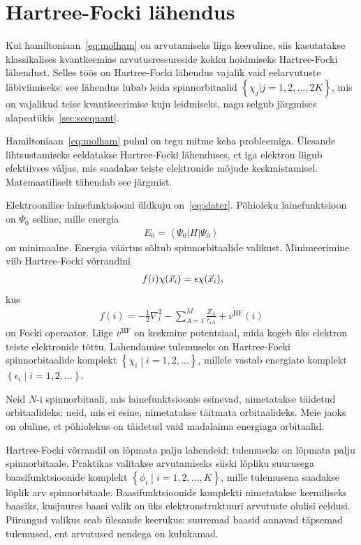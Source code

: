 \documentclass[12pt]{report}
\def\cparen#1{\left\{#1\right\}}
\def\bra#1{\left<#1\right|}
\def\ket#1{\left|#1\right>}
\begin{document}
\section{Hartree-Focki lähendus}\label{sec:hartfock}

Kui hamiltoniaan~\eqref{eq:molham} on arvutamiseks liiga keeruline, siis kasutatakse klassikalises kvantkeemias arvutusressursside kokku hoidmiseks Hartree-Focki lähendust.
Selles töös on Hartree-Focki lähendus vajalik vaid eelarvutuste läbiviimiseks: see lähendus lubab leida spinnorbitaalid \(\cparen{\chi_j | j=1, 2, \ldots, 2K}\), mis on vajalikud teise kvantiseerimise kuju leidmiseks, nagu selgub järgmises alapeatükis~\ref{sec:secquant}.

Hamiltoniaan~\ref{eq:molham} puhul on tegu mitme keha probleemiga.
Ülesande lihtsustamiseks eeldatakse Hartree-Focki lähenduses, et iga elektron liigub efektiivses väljas, mis saadakse teiste elektronide mõjude keskmistamisel.
Matemaatiliselt tähendab see järgmist.

Elektroonilise lainefunktsiooni üldkuju on~\eqref{eq:slater}.
Põhioleku lainefunktsioon on \(\Psi_0\) selline, mille energia
\begin{align}
    E_0 = \bra{\Psi_0} H \ket{\Psi_0}
\end{align}
on minimaalne.
Energia väärtus sõltub spinnorbitaalide valikust.
Minimeerimine viib Hartree-Focki võrrandini
\begin{align}
    f(i) \chi(\vec{x}_i) = \epsilon \chi(\vec{x}_i) \rlap{,}
\end{align}
kus
\begin{align}
  f(i) = -\frac{1}{2} \nabla_i^2 - \sum_{A = 1}^M \frac{Z_A}{r_{iA}} + v^\text{HF}(i)
\end{align}
on Focki operaator.
Liige \(v^\text{HF}\) on keskmine potentsiaal, mida kogeb üks elektron teiste elektronide tõttu.
Lahendamise tulemuseks on Hartree-Focki spinnorbitaalide komplekt \(\cparen{\chi_i \middle| i = 1, 2, \ldots}\), millele vastab energiate komplekt \(\cparen{\epsilon_i \middle| i = 1, 2, \ldots}\).

Neid \(N\)-i spinnorbitaali, mis lainefunktsioonis esinevad, nimetatakse täidetud orbitaalideks; neid, mis ei esine, nimetatakse täitmata orbitaalideks.
Meie jaoks on oluline, et põhiolekus on täidetud vaid madalaima energiaga orbitaalid.

Hartree-Focki võrrandil on lõpmata palju lahendeid: tulemuseks on lõpmata palju spinnorbitaale.
Praktikas valitakse arvutamiseks siiski lõpliku suurusega baasifunktsioonide komplekt $\cparen{\phi_i \middle| i = 1, 2, \ldots, K}$, mille tulemusena saadakse lõplik arv spinnorbitaale.
Baasifunktsioonide komplekti nimetatakse keemiliseks baasiks, kusjuures baasi valik on üks elektronstruktuuri arvutuste olulisi eeldusi.
Piirangud valikus seab ülesande keerukus: suuremad baasid annavad täpsemad tulemused, ent arvutused nendega on kulukamad.
\end{document}

